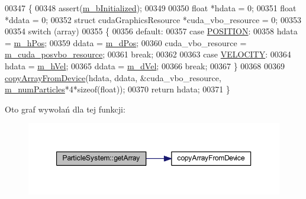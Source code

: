 \begin{DoxyCode}
00347 \{
00348     assert(\hyperlink{class_particle_system_a21bbfba9d8701a70bc6fddbf4fc3f5bd}{m\_bInitialized});
00349 
00350     \textcolor{keywordtype}{float} *hdata = 0;
00351     \textcolor{keywordtype}{float} *ddata = 0;
00352     \textcolor{keyword}{struct }cudaGraphicsResource *cuda\_vbo\_resource = 0;
00353 
00354     \textcolor{keywordflow}{switch} (array)
00355     \{
00356         \textcolor{keywordflow}{default}:
00357         \textcolor{keywordflow}{case} \hyperlink{class_particle_system_a332fbe57a36aaea5c18b4ea4fba6bbb3a9e9a2992d230a2674debf26e0e8e0299}{POSITION}:
00358             hdata = \hyperlink{class_particle_system_ab9d75471d2eaaeb8fa98d2f3f47d9c25}{m\_hPos};
00359             ddata = \hyperlink{class_particle_system_afff6217d2726217dff77c81ef3c23bfa}{m\_dPos};
00360             cuda\_vbo\_resource = \hyperlink{class_particle_system_a9c5de70c1705672e5722ad30dee1b14b}{m\_cuda\_posvbo\_resource};
00361             \textcolor{keywordflow}{break};
00362 
00363         \textcolor{keywordflow}{case} \hyperlink{class_particle_system_a332fbe57a36aaea5c18b4ea4fba6bbb3a3702de73065f01b4f6ffa604b799e53d}{VELOCITY}:
00364             hdata = \hyperlink{class_particle_system_a20560c896ee8a8bbc827a8e5902da7e2}{m\_hVel};
00365             ddata = \hyperlink{class_particle_system_a5efd31a2fdba8d98b105f4e546964cb5}{m\_dVel};
00366             \textcolor{keywordflow}{break};
00367     \}
00368 
00369     \hyperlink{particles_8cpp_afed059fa8ae6691333d263c5c88281f6}{copyArrayFromDevice}(hdata, ddata, &cuda\_vbo\_resource, 
      \hyperlink{class_particle_system_a23d238efa80a647d4b6cde034f486a91}{m\_numParticles}*4*\textcolor{keyword}{sizeof}(\textcolor{keywordtype}{float}));
00370     \textcolor{keywordflow}{return} hdata;
00371 \}
\end{DoxyCode}


Oto graf wywołań dla tej funkcji\-:\nopagebreak
\begin{figure}[H]
\begin{center}
\leavevmode
\includegraphics[width=350pt]{class_particle_system_a8bdfaa6198651ef0ceb8be489ecd78e3_cgraph}
\end{center}
\end{figure}


